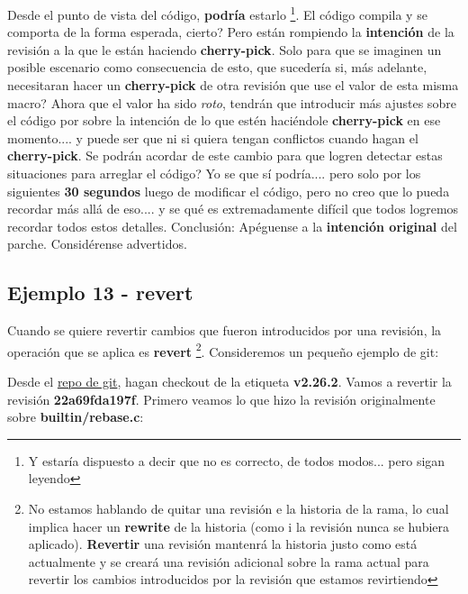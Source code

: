 Desde el punto de vista del código, {\bf podría} estarlo \footnote{Y estaría dispuesto a decir que no es correcto, de todos modos... pero
sigan leyendo}. El código compila y se comporta de la forma esperada, cierto? Pero están rompiendo la {\bf intención} de la revisión
a la que le están haciendo {\bf cherry-pick}. Solo para que se imaginen un posible escenario como consecuencia de esto, que sucedería
si, más adelante, necesitaran hacer un {\bf cherry-pick} de otra revisión que use el valor de esta misma macro? Ahora que el valor ha sido
{\it roto}, tendrán que introducir más ajustes sobre el código por sobre la intención de lo que estén haciéndole {\bf cherry-pick}
en ese momento.... y puede ser que ni si quiera tengan conflictos cuando hagan el {\bf cherry-pick}. Se podrán acordar de este cambio
para que logren detectar estas situaciones para arreglar el código? Yo se que sí podría.... pero solo por los siguientes
{\bf 30 segundos} luego de modificar el código, pero no creo que lo pueda recordar más allá de eso.... y se qué es extremadamente
difícil que todos logremos recordar todos estos detalles. Conclusión: Apéguense a la {\bf intención original} del parche.
Considérense advertidos.

\subsection{Ejemplo 13 - revert}
\label{example_13}

Cuando se quiere revertir cambios que fueron introducidos por una revisión, la operación que se aplica es {\bf revert}
\footnote{No estamos hablando de quitar una revisión e la historia de la rama, lo cual implica hacer un {\bf rewrite} de
la historia (como i la revisión nunca se hubiera aplicado). {\bf Revertir} una revisión mantenrá la historia justo como
está actualmente y se creará una revisión adicional sobre la rama actual para revertir los cambios introducidos por la
revisión que estamos revirtiendo}. Consideremos un pequeño ejemplo de git:

Desde el \hyperref[git_repo]{repo de git}, hagan checkout de la etiqueta {\bf v2.26.2}. Vamos a revertir la revisión {\bf 22a69fda197f}.
Primero veamos lo que hizo la revisión originalmente sobre {\bf builtin/rebase.c}:

